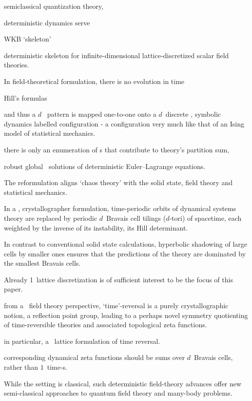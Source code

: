 semiclassical quantization theory,

deterministic dynamics serve

 WKB `skeleton'

deterministic skeleton for
infinite-dimensional lattice-discretized scalar field theories.

In
field-theoretical formulation, there is no evolution in time

Hill's formulas

and thus a $d$\dmn\ {\spt} pattern is
mapped one-to-one onto a $d$\dmn\ discrete {\lattstate}, symbolic
dynamics labelled configuration - a configuration very much like that of an
Ising model of statistical mechanics.


there is only an enumeration of {\lattstate}s
that contribute to theory's partition sum,

robust global \spt\
solutions of deterministic Euler–Lagrange equations.

The reformulation aligns `chaos theory' with the solid state,
field theory and statistical mechanics.

In a \spt,
crystallographer formulation, time-periodic orbits of dynamical systems
theory are replaced by periodic $d$\dmn\ {Bravais cell} tilings
($d$-tori) of spacetime, each weighted by the inverse of its instability,
its Hill determinant.

In contrast to conventional solid state
calculations, hyperbolic shadowing of large cells by smaller ones ensures
that the predictions of the theory are dominated by the smallest Bravais
cells.

Already
1\dmn\ lattice discretization is of sufficient interest to be the focus
of this paper.

from a \spt\ field theory perspective,
`time'-reversal is a purely crystallographic notion, a reflection point
group, leading to a perhaps novel symmetry quotienting of
time-reversible theories and associated topological zeta functions.


in particular, a \spt\ lattice formulation of time
reversal.



corresponding dynamical zeta functions
should be sums over $d$\dmn\ Bravais cells, rather than $1$\dmn\ time-\po s.


While the setting is classical,
such deterministic field-theory advances offer new semi-classical
approaches to quantum field theory and many-body problems.
